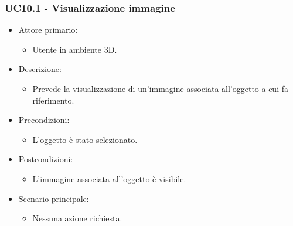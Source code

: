 \subsubsection{UC10.1 - Visualizzazione immagine}
\begin{itemize}
	
	\item Attore primario: 
	\begin{itemize}
		\item Utente in ambiente 3D.
	\end{itemize}
	\item Descrizione:
	\begin{itemize}
		\item Prevede la visualizzazione di un'immagine associata all'oggetto a cui fa riferimento.
	\end{itemize}
	
	\item Precondizioni:
	\begin{itemize}
		\item L'oggetto è stato selezionato.
	\end{itemize}
	
	\item Postcondizioni:
	\begin{itemize}
		\item L'immagine associata all'oggetto è visibile.
	\end{itemize}
	
	\item Scenario principale:
	\begin{itemize}
		\item Nessuna azione richiesta.
	\end{itemize}
	
\end{itemize}


